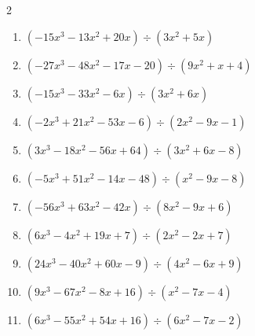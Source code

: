 \begin{multicols}{2}
\begin{enumerate}
\columnbreak %

\resetques

  \item $(-15x^{3}-13x^{2}+20x) \div (3x^{2}+5x)$

        \phantom{$商 : -5x+4, \quad 剰余 : 5x-6$}

  \item $(-27x^{3}-48x^{2}-17x-20) \div (9x^{2}+x+4)$

        \phantom{$商 : -3x-5, \quad 剰余 : -9x-1$}

  \item $(-15x^{3}-33x^{2}-6x) \div (3x^{2}+6x)$

        \phantom{$商 : -5x-1, \quad 剰余 : 8x-7$}

  \item $(-2x^{3}+21x^{2}-53x-6) \div (2x^{2}-9x-1)$

        \phantom{$商 : -x+6, \quad 剰余 : 5x-8$}

  \item $(3x^{3}-18x^{2}-56x+64) \div (3x^{2}+6x-8)$

        \phantom{$商 : x-8, \quad 剰余 : 2x-2$}

\columnbreak %

  \item $(-5x^{3}+51x^{2}-14x-48) \div (x^{2}-9x-8)$

        \phantom{$商 : -5x+6, \quad 剰余 : 8x-1$}

  \item $(-56x^{3}+63x^{2}-42x) \div (8x^{2}-9x+6)$

        \phantom{$商 : -7x, \quad 剰余 : 9$}

  \item $(6x^{3}-4x^{2}+19x+7) \div (2x^{2}-2x+7)$

        \phantom{$商 : 3x+1, \quad 剰余 : -6x+7$}

  \item $(24x^{3}-40x^{2}+60x-9) \div (4x^{2}-6x+9)$

        \phantom{$商 : 6x-1, \quad 剰余 : 4x-2$}

  \item $(9x^{3}-67x^{2}-8x+16) \div (x^{2}-7x-4)$

        \phantom{$商 : 9x-4, \quad 剰余 : -7x-4$}

\columnbreak %

\resetques

  \item $(6x^{3}-55x^{2}+54x+16) \div (6x^{2}-7x-2)$


\end{enumerate}
\end{multicols}
